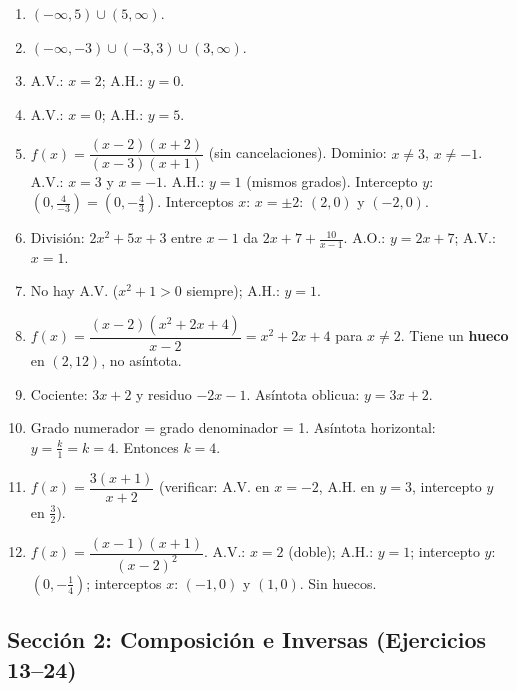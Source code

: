\documentclass[12pt, letterpaper]{article}
\begin{document}
  \begin{enumerate}[series=respuestas, leftmargin=*, label=\textbf{\arabic*.}]
    \item $(-\infty, 5) \cup (5, \infty)$.

    \item $(-\infty, -3) \cup (-3, 3) \cup (3, \infty)$.

    \item A.V.: $x = 2$; A.H.: $y = 0$.

    \item A.V.: $x = 0$; A.H.: $y = 5$.

    \item $f(x) = \dfrac{(x - 2)(x + 2)}{(x - 3)(x + 1)}$ (sin cancelaciones). Dominio: $x \neq 3$, $x \neq -1$. A.V.: $x = 3$ y $x = -1$. A.H.: $y = 1$ (mismos grados). Intercepto $y$: $(0, \frac{4}{-3}) = (0, -\frac{4}{3})$. Interceptos $x$: $x = \pm 2$: $(2, 0)$ y $(-2, 0)$.

    \item División: $2x^2 + 5x + 3$ entre $x - 1$ da $2x + 7 + \frac{10}{x - 1}$. A.O.: $y = 2x + 7$; A.V.: $x = 1$.

    \item No hay A.V. ($x^2 + 1 > 0$ siempre); A.H.: $y = 1$.

    \item $f(x) = \dfrac{(x - 2)(x^2 + 2x + 4)}{x - 2} = x^2 + 2x + 4$ para $x \neq 2$. Tiene un \textbf{hueco} en $(2, 12)$, no asíntota.

    \item Cociente: $3x + 2$ y residuo $-2x - 1$. Asíntota oblicua: $y = 3x + 2$.

    \item Grado numerador = grado denominador = 1. Asíntota horizontal: $y = \frac{k}{1} = k = 4$. Entonces $k = 4$.

    \item $f(x) = \dfrac{3(x + 1)}{x + 2}$ (verificar: A.V. en $x = -2$, A.H. en $y = 3$, intercepto $y$ en $\frac{3}{2}$).

    \item $f(x) = \dfrac{(x - 1)(x + 1)}{(x - 2)^2}$. A.V.: $x = 2$ (doble); A.H.: $y = 1$; intercepto $y$: $(0, -\frac{1}{4})$; interceptos $x$: $(-1, 0)$ y $(1, 0)$. Sin huecos.
  \end{enumerate}

  \newpage


  \subsection*{Sección 2: Composición e Inversas (Ejercicios 13--24)}
\end{document}
